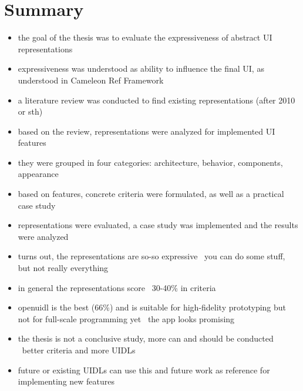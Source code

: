 \chapter{Summary}\label{ch:summary}

\begin{itemize}
    \item the goal of the thesis was to evaluate the expressiveness of abstract UI representations
    \item expressiveness was understood as ability to influence the final UI, as understood in Cameleon Ref Framework
    \item a literature review was conducted to find existing representations (after 2010 or sth)
    \item based on the review, representations were analyzed for implemented UI features
    \item they were grouped in four categories: architecture, behavior, components, appearance
    \item based on features, concrete criteria were formulated, as well as a practical case study
    \item representations were evaluated, a case study was implemented and the results were analyzed
    \item turns out, the representations are so-so expressive \textendash\ you can do some stuff, but not really everything
    \item in general the representations score ~30-40\% in criteria
    \item openuidl is the best (66\%) and is suitable for high-fidelity prototyping but not for full-scale programming yet \textendash\ the app looks promising
    \item the thesis is not a conclusive study, more can and should be conducted \textendash\ better criteria and more UIDLs
    \item future or existing UIDLs can use this and future work as reference for implementing new features
\end{itemize}
